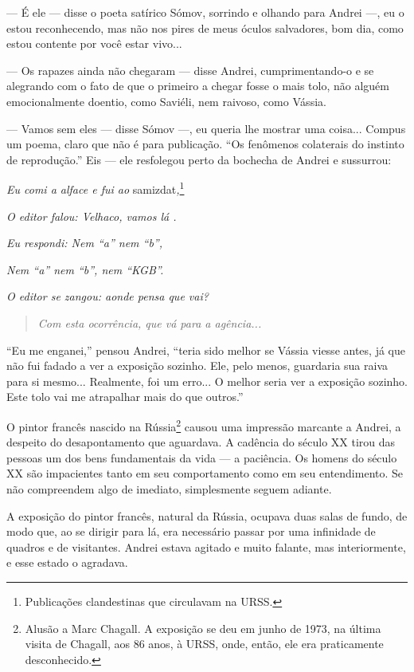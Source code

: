 --- É ele --- disse o poeta satírico Sómov, sorrindo e olhando para
Andrei ---, eu o estou reconhecendo, mas não nos pires de meus óculos
salvadores, bom dia, como estou contente por você estar vivo...

--- Os rapazes ainda não chegaram --- disse Andrei, cumprimentando-o e
se alegrando com o fato de que o primeiro a chegar fosse o mais tolo,
não alguém emocionalmente doentio, como Saviéli, nem raivoso, como
Vássia.

--- Vamos sem eles --- disse Sómov ---, eu queria lhe mostrar uma
coisa... Compus um poema, claro que não é para publicação. ``Os
fenômenos colaterais do instinto de reprodução.'' Eis --- ele resfolegou
perto da bochecha de Andrei e sussurrou:

\emph{Eu comi a alface e fui ao} samizdat\emph{,}\footnote{Publicações
  clandestinas que circulavam na URSS.}

\emph{O editor falou: Velhaco, vamos lá .}

\emph{Eu respondi: Nem ``a'' nem ``b'',}

\emph{Nem ``a'' nem ``b'', nem ``KGB''.}

\emph{O editor se zangou: aonde pensa que vai?}

\begin{quote}
\emph{Com esta ocorrência, que vá para a agência...}
\end{quote}

``Eu me enganei,'' pensou Andrei, ``teria sido melhor se Vássia viesse
antes, já que não fui fadado a ver a exposição sozinho. Ele, pelo menos,
guardaria sua raiva para si mesmo... Realmente, foi um erro... O melhor
seria ver a exposição sozinho. Este tolo vai me atrapalhar mais do que
outros.''

O pintor francês nascido na Rússia\footnote{Alusão a Marc Chagall. A
  exposição se deu em junho de 1973, na última visita de Chagall, aos 86
  anos, à URSS, onde, então, ele era praticamente desconhecido.} causou
uma impressão marcante a Andrei, a despeito do desapontamento que
aguardava. A cadência do século XX tirou das pessoas um dos bens
fundamentais da vida --- a paciência. Os homens do século XX são
impacientes tanto em seu comportamento como em seu entendimento. Se não
compreendem algo de imediato, simplesmente seguem adiante.

A exposição do pintor francês, natural da Rússia, ocupava duas salas de
fundo, de modo que, ao se dirigir para lá, era necessário passar por uma
infinidade de quadros e de visitantes. Andrei estava agitado e muito
falante, mas interiormente, e esse estado o agradava.

